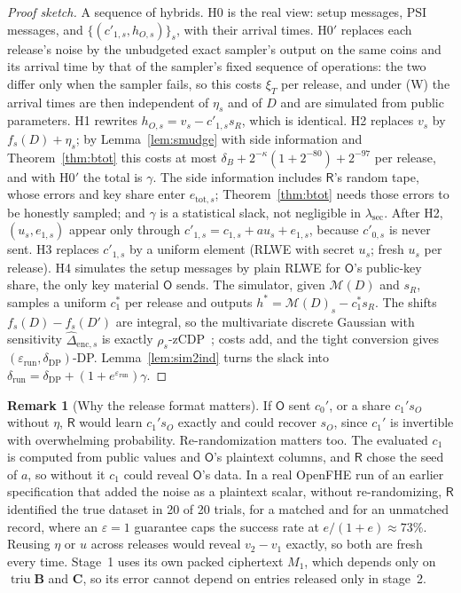 \documentclass[11pt]{article}
\theoremstyle{definition}
\newtheorem{remark}{Remark}[section]
\theoremstyle{plain}
\newcommand{\bB}{\mathbf{B}}
\newcommand{\bC}{\mathbf{C}}
\newcommand{\Party}[1]{\textsf{#1}}
\newcommand{\Rp}{\Party{R}}
\newcommand{\Op}{\Party{O}}
\DeclareMathOperator{\triu}{triu}
\begin{document}
\begin{proof}[Proof sketch]
A sequence of hybrids. H0 is the real view: setup messages, PSI messages, and $\{(c'_{1,s}, h_{O,s})\}_s$, with their arrival times. H0$'$ replaces each release's noise by the unbudgeted exact sampler's output on the same coins and its arrival time by that of the sampler's fixed sequence of operations: the two differ only when the sampler fails, so this costs $\xi_T$ per release, and under (W) the arrival times are then independent of $\eta_s$ and of $D$ and are simulated from public parameters. H1 rewrites $h_{O,s} = v_s - c'_{1,s}s_R$, which is identical. H2 replaces $v_s$ by $f_s(D) + \eta_s$; by Lemma~\ref{lem:smudge} with side information and Theorem~\ref{thm:btot} this costs at most $\delta_B + 2^{-\kappa}(1 + 2^{-80}) + 2^{-97}$ per release, and with H0$'$ the total is $\gamma$. The side information includes $\Rp$'s random tape, whose errors and key share enter $e_{\mathrm{tot},s}$; Theorem~\ref{thm:btot} needs those errors to be honestly sampled; and $\gamma$ is a statistical slack, not negligible in $\lambda_{\mathrm{sec}}$. After H2, $(u_s, e_{1,s})$ appear only through $c'_{1,s} = c_{1,s} + a u_s + e_{1,s}$, because $c'_{0,s}$ is never sent. H3 replaces $c'_{1,s}$ by a uniform element (RLWE with secret $u_s$; fresh $u_s$ per release). H4 simulates the setup messages by plain RLWE for $\Op$'s public-key share, the only key material $\Op$ sends. The simulator, given $\mathcal M(D)$ and $s_R$, samples a uniform $c_1^\ast$ per release and outputs $h^\ast = \mathcal M(D)_s - c_1^\ast s_R$. The shifts $f_s(D) - f_s(D')$ are integral, so the multivariate discrete Gaussian with sensitivity $\widehat\Delta_{\mathrm{enc},s}$ is exactly $\rho_s$-zCDP~\cite{canonne2020discrete}; costs add, and the tight conversion gives $(\varepsilon_{\mathrm{run}}, \delta_{\mathrm{DP}})$-DP. Lemma~\ref{lem:sim2ind} turns the slack into $\delta_{\mathrm{run}} = \delta_{\mathrm{DP}} + (1 + e^{\varepsilon_{\mathrm{run}}})\gamma$.
\end{proof}

\begin{remark}[Why the release format matters]
\label{rem:format}
If $\Op$ sent $c_0'$, or a share $c_1' s_O$ without $\eta$, $\Rp$ would learn $c_1' s_O$ exactly and could recover $s_O$, since $c_1'$ is invertible with overwhelming probability. Re-randomization matters too. The evaluated $c_1$ is computed from public values and $\Op$'s plaintext columns, and $\Rp$ chose the seed of $a$, so without it $c_1$ could reveal $\Op$'s data. In a real OpenFHE run of an earlier specification that added the noise as a plaintext scalar, without re-randomizing, $\Rp$ identified the true dataset in 20 of 20 trials, for a matched and for an unmatched record, where an $\varepsilon = 1$ guarantee caps the success rate at $e/(1 + e) \approx 73\%$. Reusing $\eta$ or $u$ across releases would reveal $v_2 - v_1$ exactly, so both are fresh every time. Stage~1 uses its own packed ciphertext $M_1$, which depends only on $\triu\bB$ and $\bC$, so its error cannot depend on entries released only in stage~2.
\end{remark}
\end{document}
